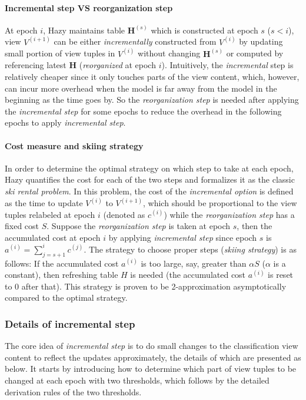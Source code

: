 \paragraph{Incremental step VS reorganization step} At epoch $i$, Hazy maintains table $\textbf{H}^{(s)}$ which is constructed at epoch $s$ ($s < i$), view $V^{(i+1)}$ can be either {\em incrementally} constructed from $V^{(i)}$ by updating small portion of view tuples in $V^{(i)}$ without changing $\textbf{H}^{(s)}$ or computed by referencing latest $\textbf{H}$ ({\em reorganized} at epoch $i$). Intuitively, the {\em incremental} step is relatively cheaper since it only touches parts of the view content, which, however, can incur more overhead when the model is far away from the model in the beginning as the time goes by. So the {\em reorganization step} is needed after applying the {\em incremental step} for some epochs to reduce the overhead in the following epochs to apply {\em incremental step}.

\paragraph{Cost measure and skiing strategy} In order to determine the optimal strategy on which step to take at each epoch, Hazy quantifies the cost for each of the two steps and formalizes it as the classic {\em ski rental problem}. In this problem, the cost of the {\em incremental option} is defined as the time to update $V^{(i)}$ to $V^{(i+1)}$, which should be proportional to the view tuples relabeled at epoch $i$ (denoted as $c^{(i)}$) while the {\em reorganization step} has a fixed cost $S$. Suppose the {\em reorganization step} is taken at epoch $s$, then the accumulated cost at epoch $i$ by applying {\em incremental step} since epoch $s$ is $a^{(i)} = \sum_{j=s+1}^ic^{(j)}$. The strategy to choose proper steps ({\em skiing strategy}) is as follows: If the accumulated cost $a^{(i)}$ is too large, say, greater than $\alpha S$ ($\alpha$ is a constant), then refreshing table $H$ is needed (the accumulated cost $a^{(i)}$ is reset to 0 after that). This strategy is proven to be 2-approximation asymptotically compared to the optimal strategy.


\subsubsection{Details of incremental step}\label{Sec: incremental step}
The core idea of {\em incremental step} is to do small changes to the classification view content to reflect the updates approximately, the details of which are presented as below. It starts by introducing how to determine which part of view tuples to be changed at each epoch with two thresholds, which follows by the detailed derivation rules of the two thresholds.

